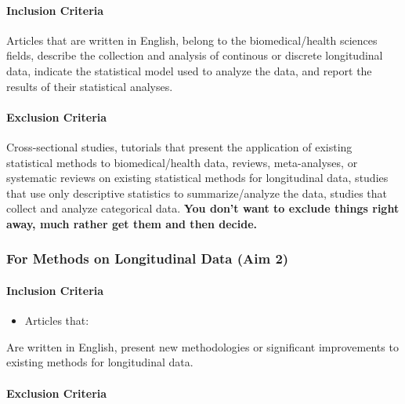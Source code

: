 \documentclass[
]{article}
\let\oldparagraph\paragraph
\renewcommand{\paragraph}[1]{\oldparagraph{#1}\mbox{}}
\providecommand{\tightlist}{%
  \setlength{\itemsep}{0pt}\setlength{\parskip}{0pt}}\usepackage{longtable,booktabs,array}
\begin{document}
\hypertarget{inclusion-criteria}{%
\paragraph{Inclusion Criteria}\label{inclusion-criteria}}

Articles that are written in English, belong to the biomedical/health
sciences fields, describe the collection and analysis of continous or
discrete longitudinal data, indicate the statistical model used to
analyze the data, and report the results of their statistical analyses.

\hypertarget{exclusion-criteria}{%
\paragraph{Exclusion Criteria}\label{exclusion-criteria}}

Cross-sectional studies, tutorials that present the application of
existing statistical methods to biomedical/health data, reviews,
meta-analyses, or systematic reviews on existing statistical methods for
longitudinal data, studies that use only descriptive statistics to
summarize/analyze the data, studies that collect and analyze categorical
data. \textbf{You don't want to exclude things right away, much rather
get them and then decide.}

\hypertarget{for-methods-on-longitudinal-data-aim-2}{%
\subsubsection{For Methods on Longitudinal Data (Aim
2)}\label{for-methods-on-longitudinal-data-aim-2}}

\hypertarget{inclusion-criteria-1}{%
\paragraph{Inclusion Criteria}\label{inclusion-criteria-1}}

\begin{itemize}
\tightlist
\item
  Articles that:
\end{itemize}

Are written in English, present new methodologies or significant
improvements to existing methods for longitudinal data.

\hypertarget{exclusion-criteria-1}{%
\paragraph{Exclusion Criteria}\label{exclusion-criteria-1}}
\end{document}
